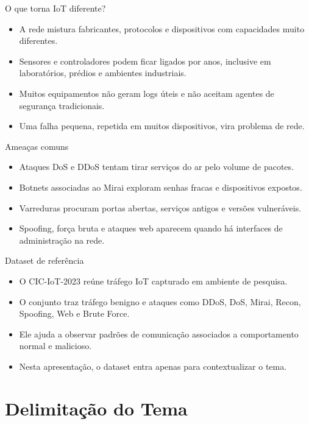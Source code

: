 \documentclass[aspectratio=169]{beamer}
\begin{document}
\begin{frame}{O que torna IoT diferente?}
    \begin{itemize}
        \item A rede mistura fabricantes, protocolos e dispositivos com capacidades muito diferentes.
        \item Sensores e controladores podem ficar ligados por anos, inclusive em laboratórios, prédios e ambientes industriais.
        \item Muitos equipamentos não geram logs úteis e não aceitam agentes de segurança tradicionais.
        \item Uma falha pequena, repetida em muitos dispositivos, vira problema de rede.
    \end{itemize}
\end{frame}

\begin{frame}{Ameaças comuns}
    \begin{itemize}
        \item Ataques DoS e DDoS tentam tirar serviços do ar pelo volume de pacotes.
        \item Botnets associadas ao Mirai exploram senhas fracas e dispositivos expostos.
        \item Varreduras procuram portas abertas, serviços antigos e versões vulneráveis.
        \item Spoofing, força bruta e ataques web aparecem quando há interfaces de administração na rede.
    \end{itemize}
\end{frame}

\begin{frame}{Dataset de referência}
    \begin{itemize}
        \item O CIC-IoT-2023 reúne tráfego IoT capturado em ambiente de pesquisa.
        \item O conjunto traz tráfego benigno e ataques como DDoS, DoS, Mirai, Recon, Spoofing, Web e Brute Force.
        \item Ele ajuda a observar padrões de comunicação associados a comportamento normal e malicioso.
        \item Nesta apresentação, o dataset entra apenas para contextualizar o tema.
    \end{itemize}
\end{frame}

\section{Delimitação do Tema}
\end{document}
